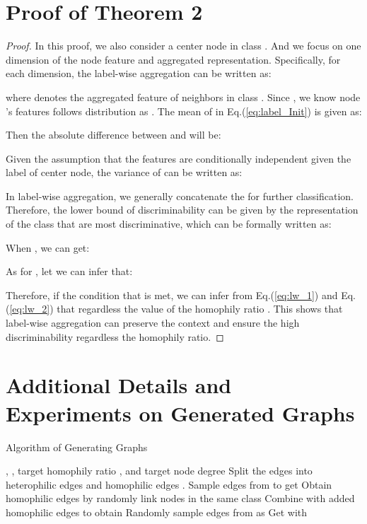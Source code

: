 \section{Proof of Theorem 2}
\label{app:theorem2}
\begin{proof}
In this proof, we also consider a center node  in class . And we focus on one dimension of the node feature and aggregated representation.
Specifically, for each dimension, the label-wise aggregation can be written as:

where  denotes the aggregated feature of neighbors  in class . 
Since , we know node 's features  follows distribution as . 
The mean of  in Eq.(\ref{eq:label_Init}) is given as:

Then the absolute difference between  and  will be:

Given the assumption that the features are conditionally independent given the label of center node, the variance of  can be written as:

In label-wise aggregation, we generally concatenate the  for further classification. Therefore, the lower bound of discriminability can be given by the representation of the class that are most discriminative, which can be formally written as:

When , we can get:

As for , let  we can infer that:


Therefore, if the condition that  is met, we can infer from Eq.(\ref{eq:lw_1}) and Eq.(\ref{eq:lw_2}) that  regardless the value of the homophily ratio .
This shows that label-wise aggregation can preserve the context and ensure the high discriminability regardless the homophily ratio.
\end{proof}

\section{Additional Details and Experiments on Generated Graphs}

\begin{algorithm}[h!]
\caption{ Algorithm of Generating Graphs}
\label{alg:graph}
\begin{algorithmic}[1]
\REQUIRE
, , target homophily ratio , and target node degree 
\ENSURE 
\STATE Split the edges  into heterophilic edges  and homophilic edges .
\IF{}
    \STATE Sample  edges from  to get 
\ELSE
    \STATE Obtain  homophilic edges by randomly link nodes in the same class
    \STATE  Combine  with added homophilic edges  to obtain 
\ENDIF
\STATE Randomly sample  edges from  as 
\STATE Get  with  
\end{algorithmic}
\end{algorithm}


